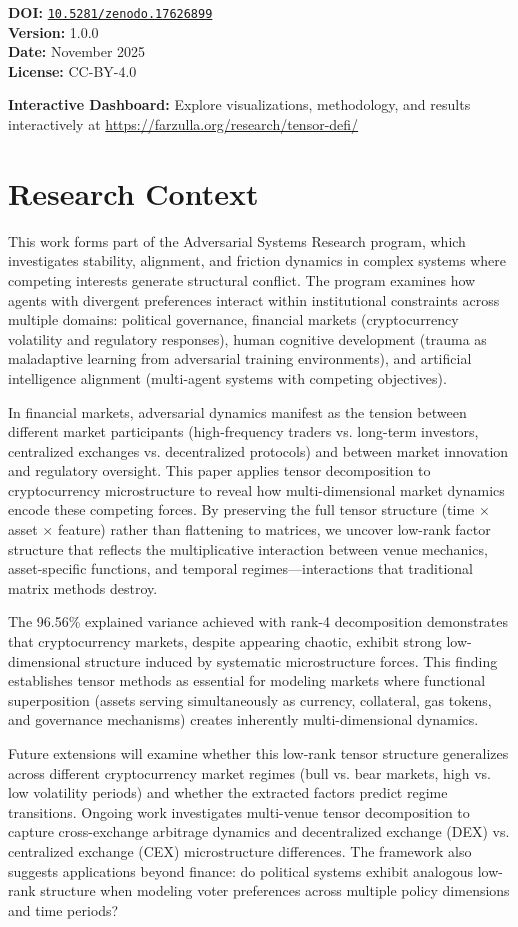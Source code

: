 \documentclass[11pt,twocolumn]{article}
\newcommand{\paperver}{1.0.0}
\newcommand{\paperdate}{November 2025}
\newcommand{\metadatabox}[1]{%
\begin{tcolorbox}[
    colback=gray!5,
    colframe=farzullaburgundy,
    title=Publication Metadata,
    fonttitle=\bfseries,
    coltitle=white,
    colbacktitle=farzullaburgundy,
    width=\columnwidth,
    arc=2mm,
    boxrule=0.8pt
]
\small
\textbf{DOI:} \href{https://doi.org/#1}{\texttt{#1}}\\
\textbf{Version:} \paperver\\
\textbf{Date:} \paperdate\\
\textbf{License:} CC-BY-4.0
\end{tcolorbox}
}
\begin{document}
\metadatabox{10.5281/zenodo.17626899}

\vspace{0.5em}
\noindent \textbf{Interactive Dashboard:} Explore visualizations, methodology, and results interactively at \url{https://farzulla.org/research/tensor-defi/}

\section*{Research Context}

This work forms part of the Adversarial Systems Research program, which investigates stability, alignment, and friction dynamics in complex systems where competing interests generate structural conflict. The program examines how agents with divergent preferences interact within institutional constraints across multiple domains: political governance, financial markets (cryptocurrency volatility and regulatory responses), human cognitive development (trauma as maladaptive learning from adversarial training environments), and artificial intelligence alignment (multi-agent systems with competing objectives).

In financial markets, adversarial dynamics manifest as the tension between different market participants (high-frequency traders vs. long-term investors, centralized exchanges vs. decentralized protocols) and between market innovation and regulatory oversight. This paper applies tensor decomposition to cryptocurrency microstructure to reveal how multi-dimensional market dynamics encode these competing forces. By preserving the full tensor structure (time $\times$ asset $\times$ feature) rather than flattening to matrices, we uncover low-rank factor structure that reflects the multiplicative interaction between venue mechanics, asset-specific functions, and temporal regimes—interactions that traditional matrix methods destroy.

The 96.56\% explained variance achieved with rank-4 decomposition demonstrates that cryptocurrency markets, despite appearing chaotic, exhibit strong low-dimensional structure induced by systematic microstructure forces. This finding establishes tensor methods as essential for modeling markets where functional superposition (assets serving simultaneously as currency, collateral, gas tokens, and governance mechanisms) creates inherently multi-dimensional dynamics.

Future extensions will examine whether this low-rank tensor structure generalizes across different cryptocurrency market regimes (bull vs. bear markets, high vs. low volatility periods) and whether the extracted factors predict regime transitions. Ongoing work investigates multi-venue tensor decomposition to capture cross-exchange arbitrage dynamics and decentralized exchange (DEX) vs. centralized exchange (CEX) microstructure differences. The framework also suggests applications beyond finance: do political systems exhibit analogous low-rank structure when modeling voter preferences across multiple policy dimensions and time periods?
\end{document}
